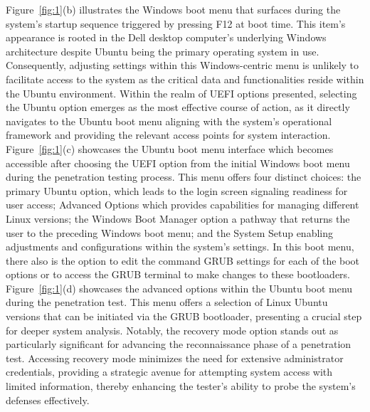 \documentclass[manuscript,acmsmall,anonymous,review,screen,nonacm=true, authorversion=true]{acmart}
\begin{document}
Figure~\ref{fig:1}(b) illustrates the Windows boot menu that surfaces during the system's startup
sequence triggered by pressing F12 at boot time. This item's appearance is rooted in the
Dell desktop computer's underlying Windows architecture despite Ubuntu being the primary
operating system in use. Consequently, adjusting settings within this Windows-centric
menu is unlikely to facilitate access to the system as the critical data and functionalities reside
within the Ubuntu environment. Within the realm of UEFI options presented, selecting the
Ubuntu option emerges as the most effective course of action, as it directly navigates to the
Ubuntu boot menu aligning with the system's operational framework and providing the relevant
access points for system interaction.
Figure~\ref{fig:1}(c) showcases the Ubuntu boot menu interface which becomes accessible after
choosing the UEFI option from the initial Windows boot menu during the penetration testing
process. This menu offers four distinct choices: the primary Ubuntu option, which leads to
the login screen signaling readiness for user access; Advanced Options which provides
capabilities for managing different Linux versions; the Windows Boot Manager option a pathway that returns the user to the preceding Windows boot menu; and the System Setup
enabling adjustments and configurations within the system's settings. In this boot menu,
there also is the option to edit the command GRUB settings for each of the boot options or to
access the GRUB terminal to make changes to these bootloaders.
Figure~\ref{fig:1}(d) showcases the advanced options within the Ubuntu boot menu during the
penetration test. This menu offers a selection of Linux Ubuntu versions that can be initiated
via the GRUB bootloader, presenting a crucial step for deeper system analysis. Notably, the
recovery mode option stands out as particularly significant for advancing the reconnaissance
phase of a penetration test. Accessing recovery mode minimizes the need for extensive
administrator credentials, providing a strategic avenue for attempting system access with limited
information, thereby enhancing the tester's ability to probe the system's defenses effectively.
\end{document}
